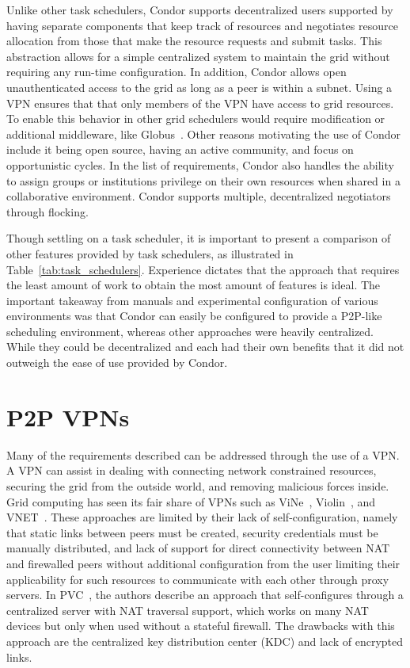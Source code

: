 Unlike other task schedulers, Condor supports decentralized users supported
by having separate components that keep track of resources and negotiates
resource allocation from those that make the resource requests and submit
tasks.  This abstraction allows for a simple centralized system to maintain the
grid without requiring any run-time configuration.  In addition, Condor allows
open unauthenticated access to the grid as long as a peer is within a subnet.
Using a VPN ensures that that only members of the VPN have access to grid
resources.  To enable this behavior in other grid schedulers would require
modification or additional middleware, like Globus~\cite{globus_toolkit}.
Other reasons motivating the use of Condor include it being open source, having
an active community, and focus on opportunistic cycles.  In the list of
requirements, Condor also handles the ability to assign groups or institutions
privilege on their own resources when shared in a collaborative environment.
Condor supports multiple, decentralized negotiators through flocking.

Though settling on a task scheduler, it is important to present a comparison
of other features provided by task schedulers, as illustrated in
Table~\ref{tab:task_schedulers}.  Experience dictates that the approach
that requires the least amount of work to obtain the most amount of features is
ideal.  The important takeaway from manuals and experimental configuration of
various environments was that Condor can easily be configured to provide a
P2P-like scheduling environment, whereas other approaches were heavily
centralized.  While they could be decentralized and each had their own benefits
that it did not outweigh the ease of use provided by Condor.

\section{P2P VPNs}
Many of the requirements described can be addressed through the use of a
VPN.  A VPN can assist in dealing with connecting network constrained resources,
securing the grid from the outside world, and removing malicious forces inside.
Grid computing has seen its fair share of VPNs such as ViNe~\cite{vine},
Violin~\cite{violin}, and VNET~\cite{vnet}.  These approaches are limited by
their lack of self-configuration, namely that static links between peers must
be created, security credentials must be manually distributed, and lack of
support for direct connectivity between NAT and firewalled peers without
additional configuration from the user limiting their applicability for such
resources to communicate with each other through proxy servers.  In
PVC~\cite{pvc}, the authors describe an approach that self-configures through
a centralized server with NAT traversal support, which works on many
NAT devices but only when used without a stateful firewall.  The drawbacks with
this approach are the centralized key distribution center (KDC) and lack of
encrypted links.


